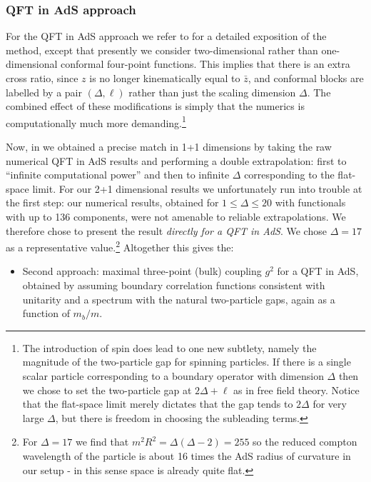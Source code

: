 \documentclass[12pt]{article}
\newcommand{\<}{{\langle}}
\renewcommand{\>}{{\rangle}}
\begin{document}
\subsubsection{QFT in AdS approach}
For the QFT in AdS approach we refer to \cite{paperI} for a detailed exposition of the method, except that presently we consider two-dimensional rather than one-dimensional conformal four-point functions. This implies that there is an extra cross ratio, since $z$ is no longer kinematically equal to $\bar z$, and conformal blocks are labelled by a pair $(\Delta,\ell)$ rather than just the scaling dimension $\Delta$. The combined effect of these modifications is simply that the numerics is computationally much more demanding.\footnote{The introduction of spin does lead to one new subtlety, namely the magnitude of the two-particle gap for spinning particles. If there is a single scalar particle corresponding to a boundary operator with dimension $\Delta$ then we chose to set the two-particle gap at $2\Delta + \ell$ as in free field theory. Notice that the flat-space limit merely dictates that the gap tends to $2 \Delta$ for very large $\Delta$, but there is freedom in choosing the subleading terms.}

Now, in \cite{paperI} we obtained a precise match in 1+1 dimensions by taking the raw numerical QFT in AdS results and performing a double extrapolation: first to ``infinite computational power'' and then to infinite $\Delta$ corresponding to the flat-space limit. For our 2+1 dimensional results we unfortunately run into trouble at the first step: our numerical results, obtained for $1 \leq \Delta \leq 20$ with functionals with up to 136 components, were not amenable to reliable extrapolations. We therefore chose to present the result \emph{directly for a QFT in AdS}. We chose $\Delta = 17$ as a representative value.\footnote{For $\Delta = 17$ we find that $m^2 R^2 = \Delta (\Delta - 2) = 255$ so the reduced compton wavelength of the particle is about 16 times the AdS radius of curvature in our setup - in this sense space is already quite flat.} Altogether this gives the:
\begin{itemize}
  \item[\color{mathematicablue}\textbullet] {\color{mathematicablue}Second approach:} maximal three-point (bulk) coupling $g^2$ for a QFT in AdS, obtained by assuming boundary correlation functions consistent with unitarity and a spectrum with the natural two-particle gaps, again as a function of $m_b/m$.
\end{itemize}
\end{document}
